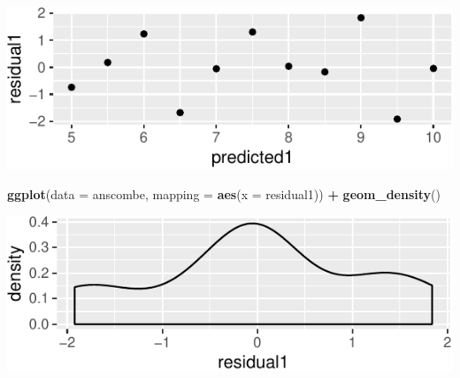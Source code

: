 \documentclass[14pt]{extarticle}
\newenvironment{Shaded}{\begin{snugshade}}{\end{snugshade}}
\newcommand{\KeywordTok}[1]{\textcolor[rgb]{0.13,0.29,0.53}{\textbf{#1}}}
\newcommand{\DataTypeTok}[1]{\textcolor[rgb]{0.13,0.29,0.53}{#1}}
\newcommand{\StringTok}[1]{\textcolor[rgb]{0.31,0.60,0.02}{#1}}
\newcommand{\OperatorTok}[1]{\textcolor[rgb]{0.81,0.36,0.00}{\textbf{#1}}}
\newcommand{\NormalTok}[1]{#1}
\begin{document}
\begin{Shaded}
\end{Shaded}

\includegraphics{20181112_anscombe_residuals_files/figure-latex/unnamed-chunk-4-1.pdf}

\begin{Shaded}
\begin{Highlighting}[]
\KeywordTok{ggplot}\NormalTok{(}\DataTypeTok{data =}\NormalTok{ anscombe, }\DataTypeTok{mapping =} \KeywordTok{aes}\NormalTok{(}\DataTypeTok{x =}\NormalTok{ residual1)) }\OperatorTok{+}
\StringTok{  }\KeywordTok{geom_density}\NormalTok{()}
\end{Highlighting}
\end{Shaded}

\includegraphics{20181112_anscombe_residuals_files/figure-latex/unnamed-chunk-5-1.pdf}
\end{document}
